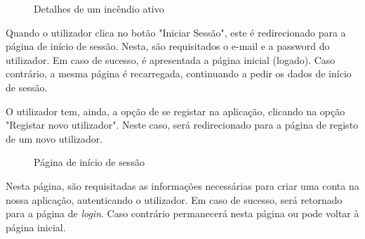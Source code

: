 \documentclass[a4paper,12pt]{scrreprt}
\newcommand{\tab}{
    \hspace{1cm}}
\begin{document}
\begin{figure}[H]
    \centering
    \caption{Detalhes de um incêndio ativo}
\end{figure}
\clearpage
\tab Quando o utilizador clica no botão "Iniciar Sessão", este é redirecionado para a página de início de sessão. Nesta, são requisitados o e-mail e a password do utilizador. Em caso de sucesso, é apresentada a página inicial (logado). Caso contrário, a mesma página é recarregada, continuando a pedir os dados de início de sessão.

\tab O utilizador tem, ainda, a opção de se registar na aplicação, clicando na opção "Registar novo utilizador". Neste caso, será redirecionado para a página de registo de um novo utilizador.

\begin{figure}[H]
    \centering
    \caption{Página de início de sessão}
\end{figure}
\clearpage
\tab Nesta página, são requisitadas as informações necessárias para criar uma conta na nossa aplicação, autenticando o utilizador. Em caso de sucesso, será retornado para a página de \textit{login}. Caso contrário permanecerá nesta página ou pode voltar à página inicial.
\end{document}
